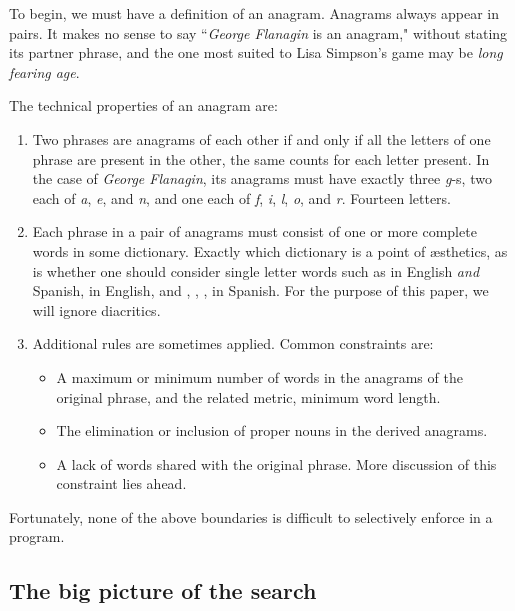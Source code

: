 \documentclass[letterpaper, 11pt]{article}
\begin{document}
To begin, we must have a definition of an anagram. Anagrams always
appear in pairs.  It makes no sense to say ``\emph{George Flanagin}
is an anagram," without stating its partner phrase, and the one
most suited to Lisa Simpson's game may be \emph{long fearing age}.

The technical properties of an anagram are:

\begin{enumerate}
\item Two phrases are anagrams of each other if and only if all the letters of
one phrase are present in the other, the same counts for each letter
present.
In the case of \emph{George Flanagin}, its
anagrams must have exactly three \emph{g}-s, two each of \emph{a},
\emph{e}, and \emph{n}, and one each of \emph{f}, \emph{i}, \emph{l},
\emph{o}, and \emph{r}.  Fourteen letters.

\item Each phrase in a pair of anagrams must consist of one or more
complete words in some dictionary.  Exactly which dictionary is a
point of {\ae}sthetics, as is whether one should consider single
letter words such as  in English \emph{and} Spanish, 
in English, and , , ,  in Spanish.  For
the purpose of this paper, we will ignore diacritics.

\item Additional rules are sometimes applied. Common constraints are:

\begin{itemize}
\item A maximum or minimum number of words in the anagrams of the original phrase,
and the related metric, minimum word length.

\item The elimination or inclusion of proper nouns in the derived
anagrams.

\item A lack of words shared with the original phrase. More discussion of this 
constraint lies ahead.
\end{itemize}
\end{enumerate}

Fortunately, none of the above boundaries is difficult to selectively
enforce in a program. 

\subsection{The big picture of the search}
\label{sec:bigpicture}
\end{document}
